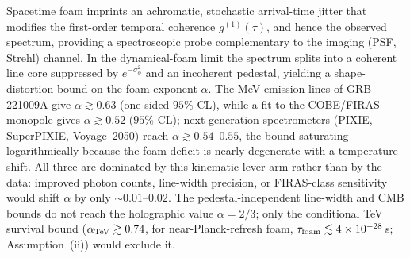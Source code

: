 \documentclass[aps,prd,onecolumn,amsmath,amssymb]{revtex4-2}
\begin{document}
Spacetime foam imprints an achromatic, stochastic arrival-time jitter
that modifies the first-order temporal coherence $g^{(1)}(\tau)$, and
hence the observed spectrum, providing a spectroscopic probe
complementary to the imaging (PSF, Strehl) channel.  In the
dynamical-foam limit the spectrum splits into a coherent line core
suppressed by $e^{-\sigma_\phi^2}$ and an incoherent pedestal, yielding
a shape-distortion bound on the foam exponent $\alpha$.  The MeV
emission lines of GRB\,221009A give $\alpha\gtrsim 0.63$ (one-sided
$95\%$ CL), while a fit to the COBE/FIRAS monopole gives
$\alpha\gtrsim 0.52$ ($95\%$ CL); next-generation
spectrometers (PIXIE, SuperPIXIE, Voyage~2050) reach
$\alpha\gtrsim 0.54$--$0.55$, the bound saturating logarithmically
because the foam deficit is nearly degenerate with a temperature shift.
All three are dominated by this kinematic lever arm rather than by the
data: improved photon counts, line-width precision, or FIRAS-class
sensitivity would shift $\alpha$ by only $\sim0.01$--$0.02$.
The pedestal-independent line-width and CMB bounds do not reach the
holographic value $\alpha=2/3$; only the conditional TeV survival bound
($\alpha_{\rm TeV}\gtrsim0.74$, for near-Planck-refresh foam,
$\tau_{\rm foam}\lesssim4\times10^{-28}$\,s; Assumption~(ii)) would exclude it.
\end{document}
